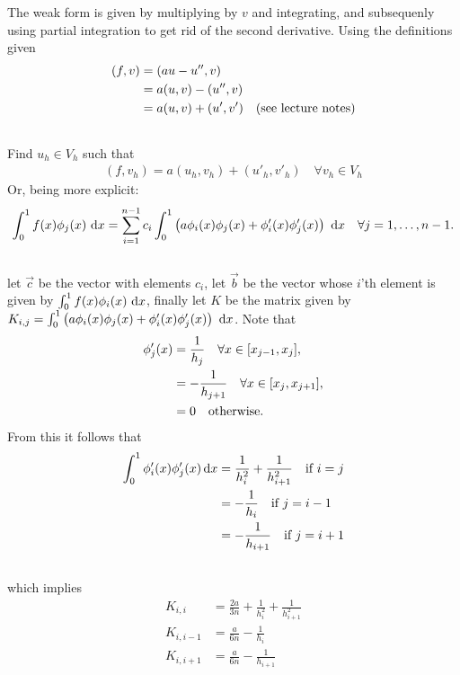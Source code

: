 
\usepackage[]{algorithm2e}


  \section{}
  \subsection{}
  The weak form is given by multiplying by $v$ and integrating, and subsequenly using partial integration to get rid of the second derivative. Using the definitions given
    \begin{align}
      (f,v) &= (au-u'',v)\\\nonumber
      &= a(u,v)-(u'',v)\\\nonumber
      &= a(u,v)+(u',v') \quad\text{(see lecture notes)}
    \end{align}
  \subsection{}
   Find $u_h \in V_h$ such that
   \begin{align}
     (f, v_h) = a(u_h, v_h) + (u'_h, v'_h)\quad\forall v_h \in V_h
   \end{align}
   Or, being more explicit:
   \begin{align}
     \int_0^1 f(x)\phi_j(x)\,\,\text{d}x = \sum_{i=1}^{n-1}  c_i \int_0^1  \left(a \phi_i(x)\phi_j(x) + \phi_i'(x)\phi_j'(x)\right)\,\,\text{d}x\quad \forall j=1,\ldots,n-1.
   \end{align}
\subsection{}
  let $\vec c$ be the vector with elements $c_i$, let $\vec b$ be the vector whose $i$'th element is given by $\int_0^1f(x)\phi_i(x)\,\,\text{d}x$, finally let $K$ be the matrix given by
  $K_{i,j} = \int_0^1  \left(a \phi_i(x)\phi_j(x) + \phi_i'(x)\phi_j'(x)\right)\,\,\text{d}x$.
  Note that
  \begin{align}
    \phi_j'(x) &= \frac{1}{h_j}\quad\forall x \in [x_{j-1}, x_j],\\\nonumber
               &= -\frac{1}{h_{j+1}}\quad\forall x \in [x_{j}, x_{j+1}],\\\nonumber
    &= 0\quad\text{otherwise.}
\end{align}
  From this it follows that
  \begin{align}
    \int_0^1 \phi_i'(x)\phi_j'(x)\,\text{d}x &= \frac{1}{h_i^2}+\frac{1}{h_{i+1}^2} \quad\text{if }i=j\\\nonumber
    &=-\frac{1}{h_i}\quad\text{if }j = i-1\\\nonumber
    &=-\frac{1}{h_{i+1}}\quad\text{if }j = i+1\\\nonumber
  \end{align}
which implies
\begin{align}
  K_{i,i} &= \frac{2a}{3n}+\frac{1}{h_i^2}+\frac{1}{h_{i+1}^2}\\
  K_{i,i-1} &= \frac{a}{6n}-\frac{1}{h_i}\\
  K_{i,i+1} &= \frac{a}{6n}-\frac{1}{h_{i+1}}
\end{align}

